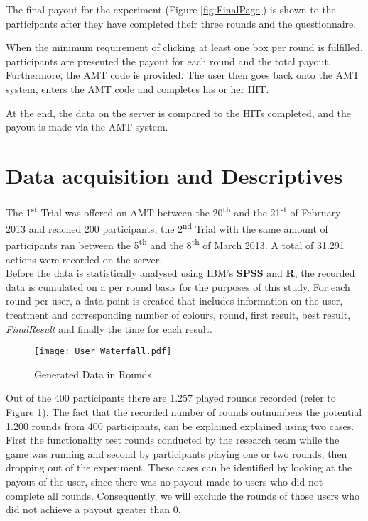 The final payout for the experiment (Figure \ref{fig:FinalPage}) is shown to the participants after they have completed their three rounds and the questionnaire. 

When the minimum requirement of clicking at least one box per round is fulfilled, participants are presented the payout for each round and the total payout. Furthermore, the \ac{AMT} code is provided.
The user then goes back onto the \ac{AMT} system, enters the \ac{AMT} code and completes his or her \ac{HIT}.

At the end, the data on the server is compared to the \ac{HIT}s completed, and the payout is made via the \ac{AMT} system.

\section{Data acquisition and Descriptives}
\label{ch:Experiment:sec:DataacquisitionDescriptives}
The 1\textsuperscript{st} Trial was offered on \ac{AMT} between the 20\textsuperscript{th} and the 21\textsuperscript{st} of February 2013 and reached 200 participants, the 2\textsuperscript{nd} Trial with the same amount of participants ran between the 5\textsuperscript{th} and the 8\textsuperscript{th} of March 2013. A total of 31.291 actions were recorded on the server.\\
Before the data is statistically analysed using IBM's \textbf{SPSS} and \textbf{R}, the recorded data is cumulated on a per round basis for the purposes of this study. For each round per user, a data point is created that includes information on the user, treatment and corresponding number of colours, round, first result, best result, \textit{FinalResult} and finally the time for each result.
 \begin{figure}[htp] %
\begin{center} %
  \texttt{[image: User\_Waterfall.pdf]}
  \caption{Generated Data in Rounds}
  \label{Data}
\end{center}
\end{figure}
Out of the 400 participants there are 1.257 played rounds recorded (refer to Figure \ref{Data}). The fact that the recorded number of rounds outnumbers the potential 1.200 rounds from 400 participants, can be explained explained using two cases. First the functionality test rounds conducted by the research team while the game was running and second by participants playing one or two rounds, then dropping out of the experiment. These cases can be identified by looking at the payout of the user, since there was no payout made to users who did not complete all rounds. Consequently, we will exclude the rounds of those users who did not achieve a payout greater than 0.\\

